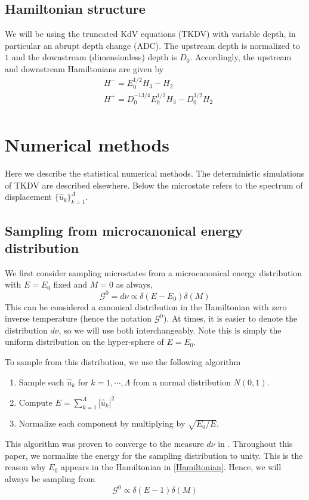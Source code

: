 \documentclass[12pt]{article}
\newcommand{\np}{\newpage \noindent}
\newcommand{\abs}[1]{\left| #1 \right|}
\newcommand{\uhat}{\hat{u}}
\newcommand{\sumk}{\sum_{k=1}^{\Lambda}}
\newcommand{\Gibbs}{\mathcal{G}}
\begin{document}
\np
\subsection{Hamiltonian structure}
We will be using the truncated KdV equations (TKDV) with variable depth, in particular an abrupt depth change (ADC). The upstream depth is normalized to $1$ and the downstream (dimensionless) depth is $D_0$. Accordingly, the upstream and downstream Hamiltonians are given by
\begin{align}
\label{Hamiltonian}
& H^- = E_0^{1/2} H_3 - H_2 \\
& H^+ = D_0^{-13/4} E_0^{1/2} H_3 - D_0^{3/2} H_2 \\
\end{align}


\section{Numerical methods}

Here we describe the statistical numerical methods. The deterministic simulations of TKDV are described elsewhere. Below the microstate refers to the spectrum of displacement $\{ \uhat_k \}_{k=1}^{\Lambda}$.

\subsection{Sampling from microcanonical energy distribution}
\label{sec_microcan}

We first consider sampling microstates from a microcanonical energy distribution with $E=E_0$ fixed and $M=0$ as always,
\begin{equation}
\Gibbs^0 = d\nu \propto \delta(E-E_0) \delta(M)
\end{equation}
This can be considered a canonical distribution in the Hamiltonian with zero inverse temperature (hence the notation $\Gibbs^0$). At times, it is easier to denote the distribution $d\nu$, so we will use both interchangeably. Note this is simply the uniform distribution on the hyper-sphere of $E=E_0$.

To sample from this distribution, we use the following algorithm
\begin{enumerate}
\item Sample each $\uhat_k$ for $k=1,\cdots,\Lambda$ from a normal distribution $N(0,1)$.
\item Compute $E = \sumk \abs{\uhat_k}^2$
\item Normalize each component by multiplying by $\sqrt{E_0/E}$.
\end{enumerate}
This algorithm was proven to converge to the measure $d\nu$ in \cite{abramov2003hamiltonian}. Throughout this paper, we normalize the energy for the sampling distribution to unity. This is the reason why $E_0$ appears in the Hamiltonian in \eqref{Hamiltonian}. Hence, we will always be sampling from
\begin{equation}
\Gibbs^0 \propto \delta(E-1) \delta(M)
\end{equation}
\end{document}

